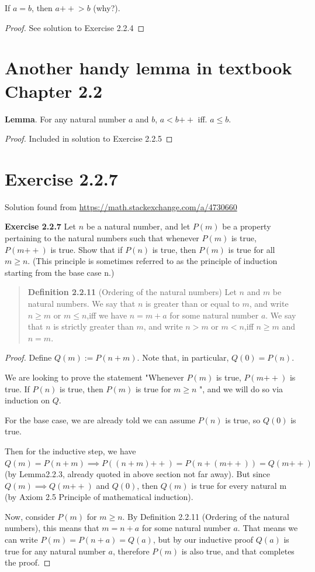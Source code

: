 \documentclass{article}
\newcommand{\doubleplus}{\mathbin{{+}{+}}}
\begin{document}
If $a = b$, then $a\doubleplus  > b$ (why?).

\begin{proof}
    See solution to Exercise 2.2.4
\end{proof}

\section{Another handy lemma in textbook Chapter 2.2}
\textbf{Lemma}. For any natural number $a$ and $b$, $a  <b\doubleplus$ iff. $a \le b$.
\begin{proof}
    Included in solution to Exercise 2.2.5
\end{proof}

\section{Exercise 2.2.7}
Solution found from \url{https://math.stackexchange.com/a/4730660}

\textbf{Exercise 2.2.7} Let $n$ be a natural number,
and let $P(m)$ be a property pertaining to the natural numbers such that
whenever $P(m)$ is true, $P(m\doubleplus)$ is true.
Show that if $P(n)$ is true, then $P(m)$ is true for all $m \ge n$.
(This principle is sometimes referred to as the principle of induction starting from the base case n.)
\begin{quotation}
    \textbf{Definition 2.2.11} (Ordering of the natural numbers)
    Let $n$ and $m$ be natural numbers.
    We say that $n$ is greater than or equal to $m$, and write $n \ge m$ or $m \le n$,iff we
    have $n = m +a$ for some natural number $a$. We say that $n$ is strictly greater than $m$,
    and write $n > m$ or $m < n$,iff $n \ge m$ and $n= m$.

\end{quotation}

\begin{proof}
    Define $Q(m):=P(n+m)$. Note that, in particular, $Q(0)=P(n)$.

    We are looking to prove the statement "Whenever $P(m)$
    is true, $P(m\doubleplus )$ is true. If $P(n)$
    is true, then $P(m)$
    is true for $m\ge n$
    ", and we will do so via induction on $Q$.

    For the base case, we are already told we can assume $P(n)$
    is true, so $Q(0)$
    is true.

    Then for the inductive step,
    we have $Q(m)=P(n+m)\implies P((n+m)\doubleplus )=P(n+(m\doubleplus ))=Q(m\doubleplus )$
    (by  Lemma2.2.3, already quoted in above section not far away).
    But since $Q(m)\implies Q(m\doubleplus )$
    and $Q(0)$, then $Q(m)$ is true for every natural m
    (by Axiom 2.5 Principle of mathematical induction).

    Now, consider $P(m)$
    for $m\ge n$.
    By  Definition 2.2.11 (Ordering of the natural numbers), this means that $m=n+a$
    for some natural number $a$.
    That means we can write $P(m)=P(n+a)=Q(a)$,
    but by our inductive proof $Q(a)$ is true for any natural number $a$,
    therefore $P(m)$ is also true, and that completes the proof.
\end{proof}
\end{document}
